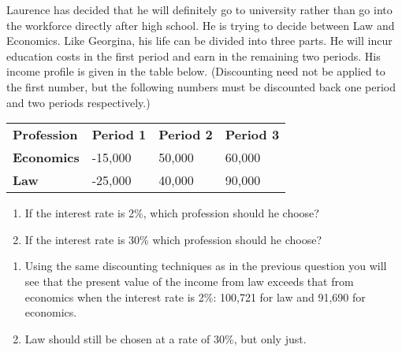 \begin{enumialphparenastyle}
\begin{ex}\label{ex:ch13ex5}
Laurence has decided that he will definitely go to university rather than go into the workforce directly after high school. He is trying to decide between Law and Economics. Like Georgina, his life can be divided into three parts. He will incur education costs in the first period and earn in the remaining two periods. His income profile is given in the table below. (Discounting need not be applied to the first number, but the following numbers must be discounted back one period and two periods respectively.)
\begin{center}
\begin{tabu} to 30em {|X[1,c]X[1,c]X[1,c]X[1,c]|}	\hline
{}	\textbf{Profession}	&	\textbf{Period 1}	&	\textbf{Period 2}	&	\textbf{Period 3}	\\
						\textbf{Economics}	&	-15,000				&	50,000				&	60,000				\\
	\textbf{Law}		&	-25,000				&	40,000				&	90,000				\\	\hline
\end{tabu}
\end{center}
\begin{enumerate}
	\item	If the interest rate is 2\%, which profession should he choose?
	\item	If the interest rate is 30\% which profession should he choose?
\end{enumerate}
\begin{sol}
\begin{enumerate}
	\item	Using the same discounting techniques as in the previous question you will see that the present value of the income from law exceeds that from economics when the interest rate is 2\%: 100,721 for law and 91,690 for economics.
	\item	Law should still be chosen at a rate of 30\%, but only just.
\end{enumerate}
\end{sol}
\end{ex}


\end{enumialphparenastyle}

